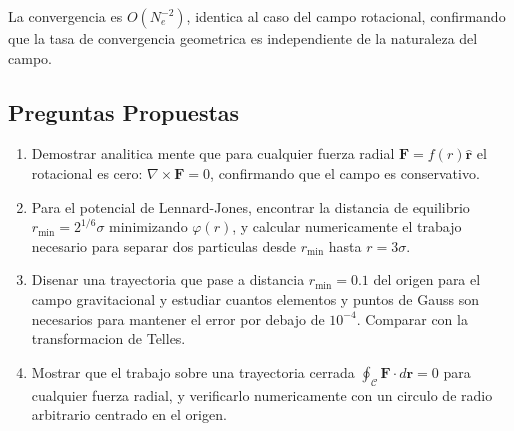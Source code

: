 \documentclass[12pt,a4paper]{article}
\begin{document}
La convergencia es $O(N_e^{-2})$, identica al caso del campo rotacional,
confirmando que la tasa de convergencia geometrica es independiente de la
naturaleza del campo.

\subsection{Preguntas Propuestas}

\begin{enumerate}
    \item Demostrar analitica mente que para cualquier fuerza radial
    $\mathbf{F} = f(r)\hat{\mathbf{r}}$ el rotacional es cero:
    $\nabla \times \mathbf{F} = 0$, confirmando que el campo es conservativo.

    \item Para el potencial de Lennard-Jones, encontrar la distancia de
    equilibrio $r_{\min} = 2^{1/6}\sigma$ minimizando $\varphi(r)$, y
    calcular numericamente el trabajo necesario para separar dos particulas
    desde $r_{\min}$ hasta $r = 3\sigma$.

    \item Disenar una trayectoria que pase a distancia $r_{\min} = 0.1$
    del origen para el campo gravitacional y estudiar cuantos elementos y
    puntos de Gauss son necesarios para mantener el error por debajo de
    $10^{-4}$. Comparar con la transformacion de Telles.

    \item Mostrar que el trabajo sobre una trayectoria cerrada
    $\oint_\mathcal{C} \mathbf{F}\cdot d\mathbf{r} = 0$ para cualquier
    fuerza radial, y verificarlo numericamente con un circulo de radio
    arbitrario centrado en el origen.
\end{enumerate}
\end{document}
